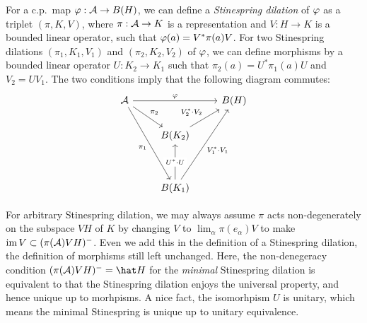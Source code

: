 \documentclass{../../small}
\begin{document}
\begin{rmk*}
For a c.p.~map $\varphi:\mathcal{A}\to B(H)$, we can define a \emph{Stinespring dilation} of $\varphi$ as a triplet $(\pi,K,V)$, where $\pi:\mathcal{A}\to K$ is a representation and $V:H\to K$ is a bounded linear operator, such that $\varphi(a)=V^*\pi(a)V$.
For two Stinespring dilations $(\pi_1,K_1,V_1)$ and $(\pi_2,K_2,V_2)$ of $\varphi$, we can define morphisms by a bounded linear operator $U:K_2\to K_1$ such that $\pi_2(a)=U^*\pi_1(a)U$ and $V_2=UV_1$.
The two conditions imply that the following diagram commutes:
\[\begin{tikzcd}
\cA\ar{rr}{\f}\ar{dr}{\pi_2}\ar[swap]{dddr}{\pi_1}&&B(H)\\
&B(K_2)\ar{ur}{V_2^*\cdot V_2}&\\
&&\\
&B(K_1)\ar[swap]{uuur}{V_1^*\cdot V_1}\ar{uu}[description]{U^*\cdot U}&
\end{tikzcd}\]

For arbitrary Stinespring dilation, we may always assume $\pi$ acts non-degenerately on the subspace $VH$ of $K$ by changing $V$ to $\lim_\alpha\pi(e_\alpha)V$ to make $\operatorname{im} V\subset(\pi(\mathcal{A})VH)^-$.
Even we add this in the definition of a Stinespring dilation, the definition of morphisms still left unchanged.
Here, the non-denegeracy condition $(\pi(\cA)VH)^-=\hat H$ for the \emph{minimal} Stinespring dilation is equivalent to that the Stinespring dilation enjoys the universal property, and hence unique up to morhpisms.
A nice fact, the isomorhpism $U$ is unitary, which means the minimal Stinespring is unique up to unitary equivalence.
\end{rmk*}
\end{document}
